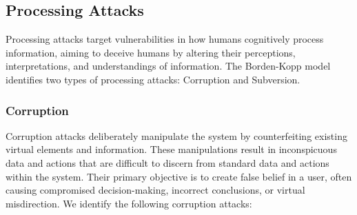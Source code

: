 

\subsection{Processing Attacks}
Processing attacks target vulnerabilities in how humans cognitively process information, aiming to deceive humans by altering their perceptions, interpretations, and understandings of information. 
The Borden-Kopp model identifies two types of processing attacks: Corruption and Subversion.

    \subsubsection{Corruption} 
Corruption attacks deliberately manipulate the \MR system by counterfeiting existing virtual elements and information.
These manipulations result in inconspicuous data and actions that are difficult to discern from standard data and actions within the \MR system.
Their primary objective is to create false belief in a user, often causing compromised decision-making, incorrect conclusions, or virtual misdirection. 
We identify the following corruption attacks:
     
